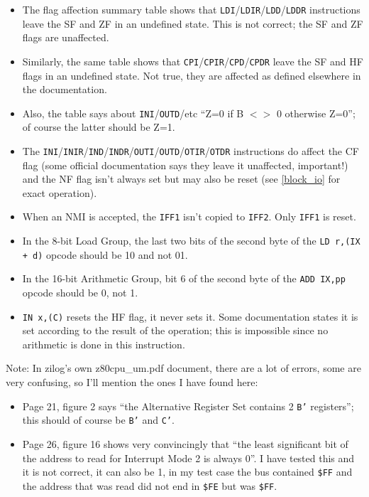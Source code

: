 \begin{itemize}

	\item
	The flag affection summary table shows that {\tt LDI}/{\tt LDIR}/{\tt LDD}/{\tt LDDR} instructions leave the SF and ZF in an undefined state. This is not correct; the SF and ZF flags are unaffected.

	\item
	Similarly, the same table shows that {\tt CPI}/{\tt CPIR}/{\tt CPD}/{\tt CPDR} leave the SF and HF flags in an undefined state. Not true, they are affected as defined elsewhere in the documentation.

	\item
	Also, the table says about {\tt INI}/{\tt OUTD}/etc ``Z=0 if B $<>$ 0 otherwise Z=0''; of course the latter should be Z=1.

	\item
	The {\tt INI}/{\tt INIR}/{\tt IND}/{\tt INDR}/{\tt OUTI}/{\tt OUTD}/{\tt OTIR}/{\tt OTDR} instructions do affect the CF flag (some official documentation says they leave it unaffected, important!) and the NF flag isn't always set but may also be reset (see \ref{block_io} for exact operation).

	\item
	When an NMI is accepted, the {\tt IFF1} isn't copied to {\tt IFF2}. Only {\tt IFF1} is reset.

	\item
	In the 8-bit Load Group, the last two bits of the second byte of the {\tt LD r,(IX + d)} opcode should be 10 and not 01.

	\item
	In the 16-bit Arithmetic Group, bit 6 of the second byte of the {\tt ADD IX,pp} opcode should be 0, not 1.

	\item
	{\tt IN x,(C)} resets the HF flag, it never sets it. Some documentation states it is set according to the result of the operation; this is impossible since no arithmetic is done in this instruction.

\end{itemize}

Note: In zilog's own z80cpu\_um.pdf document, there are a lot of errors, some are very confusing, so I'll mention the ones I have found here:

\begin{itemize}

	\item
	Page 21, figure 2 says ``the Alternative Register Set contains 2 {\tt B'} registers''; this should of course be {\tt B'} and {\tt C'}.

	\item
	Page 26, figure 16 shows very convincingly that ``the least significant bit of the address to read for Interrupt Mode 2 is always 0''. I have tested this and it is not correct, it can also be 1, in my test case the bus contained {\tt \$FF} and the address that was read did not end in {\tt \$FE} but was {\tt \$FF}.
  
\end{itemize}

